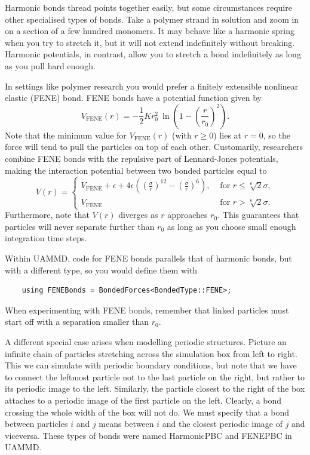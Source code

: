 Harmonic bonds thread points together easily, but some circumstances require
other specialised types of bonds. Take a polymer strand in solution and zoom in
on a section of a few hundred monomers. It may behave like a harmonic spring
when you try to stretch it, but it will not extend indefinitely without
breaking. Harmonic potentials, in contrast, allow you to stretch a bond
indefinitely as long as you pull hard enough.

In settings like polymer research you would prefer a finitely extensible
nonlinear  elastic (FENE) bond. FENE bonds have a potential function given by
\begin{equation*}
  V_\text{FENE}(r) = -\frac{1}{2} K r_0^2\ 
                \ln\left(1 - \left(\frac{r}{r_0}\right)^2\right).
\end{equation*}
Note that the minimum value for $V_\text{FENE}(r)$ (with $r \geq 0$) lies at $r
= 0$, so the force will tend to pull the particles on top of each other.
Customarily, researchers combine FENE bonds with the repulsive part of
Lennard-Jones potentials, making the interaction potential between two bonded
particles equal to
\begin{equation*}
  V(r) =
    \begin{cases}
         V_\text{FENE}
         + \epsilon
         + 4\epsilon\left(\left(\frac{\sigma}{r}\right)^{12}
                        - \left(\frac{\sigma}{r}\right)^6\right),
         & \text{ for } r \leq \sqrt[6]{2} \sigma, \\
         V_\text{FENE}
         & \text{ for } r > \sqrt[6]{2} \sigma.
    \end{cases}
\end{equation*}
Furthermore, note that $V(r)$ diverges as $r$ approaches $r_0$. This guarantees
that particles will never separate further than $r_0$ as long as you choose
small enough integration time steps.

Within UAMMD, code for FENE bonds parallels that of harmonic bonds, but with a
different type, so you would define them with
\begin{lstlisting}
    using FENEBonds = BondedForces<BondedType::FENE>;
\end{lstlisting}
When experimenting with FENE bonds, remember that linked particles must start
off with a separation smaller than $r_0$.

A different special case arises when modelling periodic structures. Picture an
infinite chain of particles stretching across the simulation box from left to
right. This we can simulate with periodic boundary conditions, but note that we
have to connect the leftmost particle not to the last particle on the right, but
rather to its periodic image to the left. Similarly, the particle closest to the
right of the box attaches to a periodic image of the first particle on the left.
Clearly, a bond crossing the whole width of the box will not do. We must specify
that a bond between particles $i$ and $j$ means between $i$ and the closest
periodic image of $j$ and viceversa. These types of bonds were named HarmonicPBC
and FENEPBC in UAMMD.

